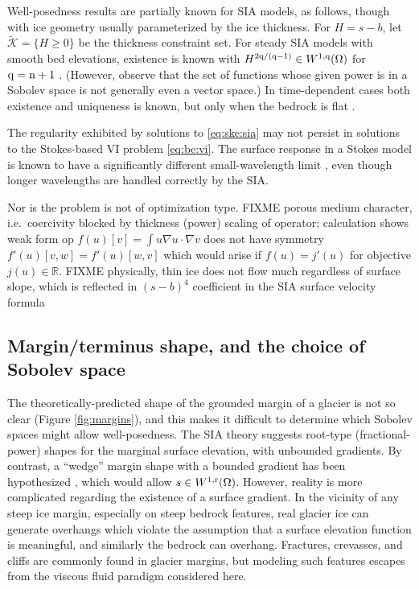 \documentclass[hidelinks,onefignum,onetabnum,final]{siamart220329}  %
\newcommand{\RR}{\mathbb{R}}
\newcommand{\grad}{\nabla}
\newcommand{\cK}{\mathcal{K}}
\newcommand{\nn}{{\text{\textnormal{n}}}}
\newcommand{\qq}{{\text{\textnormal{q}}}}
\newcommand{\rr}{{\text{\textnormal{r}}}}
\begin{document}
Well-posedness results are partially known for SIA models, as follows, though with ice geometry usually parameterized by the ice thickness.  For $H=s-b$, let $\tilde{\cK} = \{H\ge 0\}$ be the thickness constraint set.   For steady SIA models with smooth bed elevations, existence is known with $H^{2\qq/(\qq-1)} \in W^{1,\qq}(\Omega)$ for $\qq=\nn+1$ \cite{JouvetBueler2012}.  (However, observe that the set of functions whose given power is in a Sobolev space is not generally even a vector space.)  In time-dependent cases both existence and uniqueness is known, but only when the bedrock is flat \cite{Calvoetal2003,PiersantiTemam2023}.

The regularity exhibited by solutions to \eqref{eq:ske:sia} may not persist in solutions to the Stokes-based VI problem \eqref{eq:be:vi}.  The surface response in a Stokes model is known to have a significantly different small-wavelength limit \cite{Pattynetal2008}, even though longer wavelengths are handled correctly by the SIA.

Nor is the problem is not of optimization type.  FIXME porous medium character, i.e.~coercivity blocked by thickness (power) scaling of operator; calculation shows weak form op $f(u)[v] = \int u \grad u\cdot \grad v$ does not have symmetry $f'(u)[v,w] = f'(u)[w,v]$ which would arise if $f(u)=j'(u)$ for objective $j(u) \in \RR$.  FIXME physically, thin ice does not flow much regardless of surface slope, which is reflected in $(s-b)^4$ coefficient in the SIA surface velocity formula

\subsection{Margin/terminus shape, and the choice of Sobolev space} \label{subsec:margin}  The theoretically-predicted shape of the grounded margin of a glacier is not so clear (Figure \ref{fig:margins}), and this makes it difficult to determine which Sobolev spaces might allow well-posedness.  The SIA theory suggests root-type (fractional-power) shapes \cite{Bueleretal2005} for the marginal surface elevation, with unbounded gradients.  By contrast, a ``wedge'' margin shape with a bounded gradient has been hypothesized \cite[for example]{EchelmeyerKamb1986}, which would allow $s\in W^{1,\rr}(\Omega)$.  However, reality is more complicated regarding the existence of a surface gradient.  In the vicinity of any steep ice margin, especially on steep bedrock features, real glacier ice can generate overhangs which violate the assumption that a surface elevation function is meaningful, and similarly the bedrock can overhang.  Fractures, crevasses, and cliffs are commonly found in glacier margins, but modeling such features escapes from the viscous fluid paradigm considered here.
\end{document}
